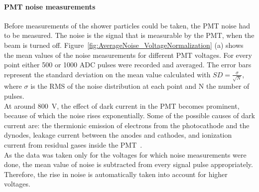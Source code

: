 \paragraph{PMT noise measurements}
Before measurements of the shower particles could be taken, the PMT noise had to be measured.
The noise is the signal that is measurable by the PMT, when the beam is turned off.
Figure~\ref{fig:AverageNoise_VoltageNormalization} (a) shows the mean values of the noise measurements for different PMT voltages. 
For every point either 500 or 1000 ADC pulses were recorded and averaged.
The error bars represent the standard deviation on the mean value calculated with \mbox{$SD=\frac{\sigma}{\sqrt{N}}$}, where $\sigma$ is the RMS of the noise distribution at each point and N the number of pulses.\\
At around \SI{800}{\volt}, the effect of dark current in the PMT becomes prominent, because of which the noise rises exponentially. 
Some of the possible causes of dark current are:
the thermionic emission of electrons from the photocathode and the dynodes, leakage current between the anodes and cathodes, and ionization current from residual gases inside the PMT~\cite[p. 67]{Hamamatsu}.
\\As the data was taken only for the voltages for which noise measurements were done, the mean value of noise is subtracted from every signal pulse appropriately. 
Therefore, the rise in noise is automatically taken into account for higher voltages.
